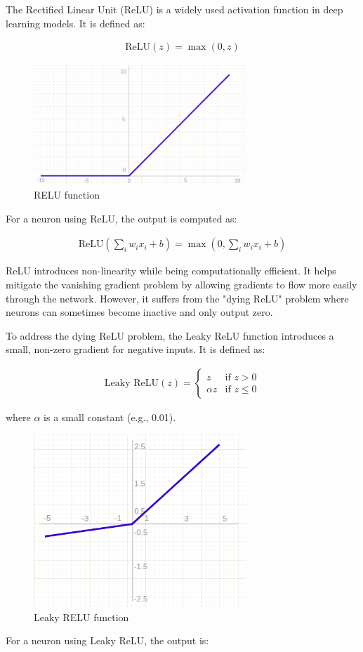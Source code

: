 The Rectified Linear Unit (ReLU) is a widely used activation function in deep learning models.
It is defined as:

\begin{align}
  \text{ReLU}(z) = \max(0, z)
\end{align}

\begin{figure}[H]
  \centering
  \includegraphics[width=80mm]{figures/relu.png}
  \caption{RELU function}
  \label{relu}
\end{figure}

For a neuron using ReLU, the output is computed as:

\begin{align}
  \text{ReLU}(\sum_i w_i x_i + b) = \max(0, \sum_i w_i x_i + b)
\end{align}

ReLU introduces non-linearity while being computationally efficient.
It helps mitigate the vanishing gradient problem by allowing gradients to flow more easily through the network.
However, it suffers from the "dying ReLU" problem where neurons can sometimes become inactive and only output zero.

To address the dying ReLU problem, the Leaky ReLU function introduces a small, non-zero gradient for negative inputs.
It is defined as:

\begin{align}
  \text{Leaky ReLU}(z) = \begin{cases}
    z & \text{if } z > 0 \\
    \alpha z & \text{if } z \leq 0
  \end{cases}
\end{align}

where \( \alpha \) is a small constant (e.g., 0.01).

\begin{figure}[H]
  \centering
  \includegraphics[width=80mm]{figures/lrelu.png}
  \caption{Leaky RELU function}
  \label{lrelu}
\end{figure}
For a neuron using Leaky ReLU, the output is:

